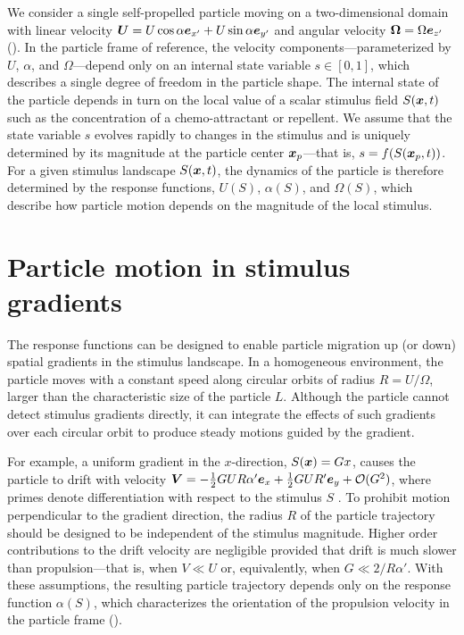 We consider a single self-propelled particle moving on a two-dimensional domain with linear velocity $\boldsymbol{U}=U\cos\alpha \boldsymbol{e}_{x'} + U\sin\alpha \boldsymbol{e}_{y'}$ and angular velocity $\boldsymbol{\Omega}=\Omega \boldsymbol{e}_{z'}$ (). In the particle frame of reference, the velocity components---parameterized by $U$, $\alpha$, and $\Omega$---depend only on an internal state variable $s\in[0,1]$, which describes a single degree of freedom in the particle shape.  The internal state of the particle depends in turn on the local value of a scalar stimulus field $S(\boldsymbol{x},t)$ such as the concentration of a chemo-attractant or repellent.  We assume that the state variable $s$ evolves rapidly to changes in the stimulus and is uniquely determined by its magnitude at the particle center $\boldsymbol{x}_p$---that is, $s=f(S(\boldsymbol{x}_p,t))$. For a given stimulus landscape $S(\boldsymbol{x},t)$, the dynamics of the particle is therefore determined by the response functions, $U(S)$, $\alpha(S)$, and $\Omega(S)$, which describe how particle motion depends on the magnitude of the local stimulus.

\section{Particle motion in stimulus gradients} %
The response functions can be designed to enable particle migration up (or down) spatial gradients in the stimulus landscape. In a homogeneous environment, the particle moves with a constant speed along circular orbits of radius $R=U/\Omega$, larger than the characteristic size of the particle $L$.  Although the particle cannot detect stimulus gradients directly, it can integrate the effects of such gradients over each circular orbit to produce steady motions guided by the gradient. 

For example, a uniform gradient in the $x$-direction, $S(\boldsymbol{x})=G x$, causes the particle to drift with velocity $\boldsymbol{V}=-\tfrac{1}{2}G U R \alpha' \boldsymbol{e}_x + \tfrac{1}{2}G U R' \boldsymbol{e}_y + \mathcal{O}(G^2)$, where primes denote differentiation with respect to the stimulus $S$ \autocite{Supp}. To prohibit motion perpendicular to the gradient direction, the radius $R$ of the particle trajectory should be designed to be independent of the stimulus magnitude. Higher order contributions to the drift velocity are negligible provided that drift is much slower than propulsion---that is, when $V\ll U$ or, equivalently, when $G\ll 2/R\alpha'$. With these assumptions, the resulting particle trajectory depends only on the response function $\alpha(S)$, which characterizes the orientation of the propulsion velocity in the particle frame ().

